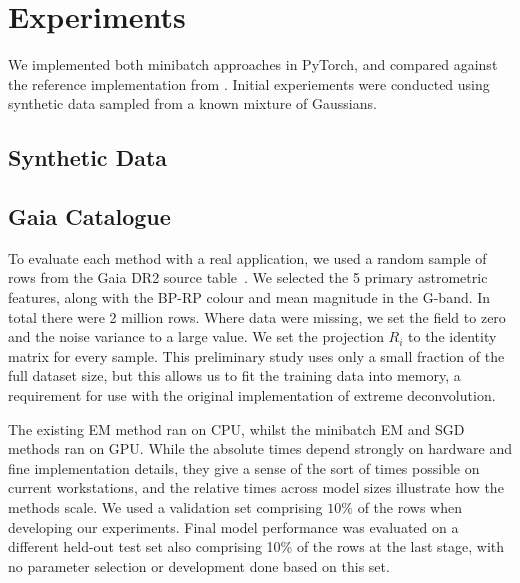 \section{Experiments}
\label{sec:experiments}

We implemented both minibatch approaches in PyTorch, and compared against the reference implementation from \citet{bovyExtremeDeconvolutionInferring2011}.
Initial experiements were conducted using synthetic data sampled from a known mixture of Gaussians.


\subsection{Synthetic Data}






\subsection{Gaia Catalogue}

To evaluate each method with a real application, we used a random sample of rows from the Gaia DR2 source table~\citep{brownGaiaDataRelease2018}.
We selected the 5 primary astrometric features, along with the BP-RP colour and mean magnitude in the G-band.
In total there were 2 million rows.
Where data were missing, we set the field to zero and the noise variance to a large value.
We set the projection $R_i$ to the identity matrix for every sample.
This preliminary study uses only a small fraction of the full dataset size, but this allows us to fit the training data into memory, a requirement for use with the original implementation of extreme deconvolution.

The existing EM method ran on CPU, whilst the minibatch EM and SGD methods ran on GPU\@.
While the absolute times depend strongly on hardware and fine implementation details, they give a sense of the sort of times possible on current workstations, and the relative times across model sizes illustrate how the methods scale.
We used a validation set comprising $10\%$ of the rows when developing our experiments.
Final model performance was evaluated on a different held-out test set also comprising 10\% of the rows at the last stage, with no parameter selection or development done based on this set.

